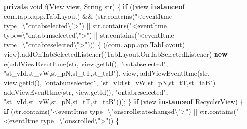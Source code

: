 \documentclass[
]{article}
\newenvironment{Shaded}{}{}
\newcommand{\BuiltInTok}[1]{\textcolor[rgb]{0.00,0.50,0.00}{#1}}
\newcommand{\ControlFlowTok}[1]{\textcolor[rgb]{0.00,0.44,0.13}{\textbf{#1}}}
\newcommand{\DataTypeTok}[1]{\textcolor[rgb]{0.56,0.13,0.00}{#1}}
\newcommand{\FunctionTok}[1]{\textcolor[rgb]{0.02,0.16,0.49}{#1}}
\newcommand{\KeywordTok}[1]{\textcolor[rgb]{0.00,0.44,0.13}{\textbf{#1}}}
\newcommand{\NormalTok}[1]{#1}
\newcommand{\OperatorTok}[1]{\textcolor[rgb]{0.40,0.40,0.40}{#1}}
\newcommand{\SpecialCharTok}[1]{\textcolor[rgb]{0.25,0.44,0.63}{#1}}
\newcommand{\StringTok}[1]{\textcolor[rgb]{0.25,0.44,0.63}{#1}}
\begin{document}
\begin{Shaded}
\begin{Highlighting}[]
    \KeywordTok{private} \DataTypeTok{void} \FunctionTok{f}\OperatorTok{(}\BuiltInTok{View}\NormalTok{ view}\OperatorTok{,} \BuiltInTok{String}\NormalTok{ str}\OperatorTok{)} \OperatorTok{\{}
        \ControlFlowTok{if} \OperatorTok{((}\NormalTok{view }\KeywordTok{instanceof}\NormalTok{ com}\OperatorTok{.}\FunctionTok{iapp}\OperatorTok{.}\FunctionTok{app}\OperatorTok{.}\FunctionTok{TabLayout}\OperatorTok{)} \OperatorTok{\&\&} \OperatorTok{(}\NormalTok{str}\OperatorTok{.}\FunctionTok{contains}\OperatorTok{(}\StringTok{"\textless{}eventItme type=}\SpecialCharTok{\textbackslash{}"}\StringTok{ontabselected}\SpecialCharTok{\textbackslash{}"}\StringTok{\textgreater{}"}\OperatorTok{)} \OperatorTok{||}\NormalTok{ str}\OperatorTok{.}\FunctionTok{contains}\OperatorTok{(}\StringTok{"\textless{}eventItme type=}\SpecialCharTok{\textbackslash{}"}\StringTok{ontabunselected}\SpecialCharTok{\textbackslash{}"}\StringTok{\textgreater{}"}\OperatorTok{)} \OperatorTok{||}\NormalTok{ str}\OperatorTok{.}\FunctionTok{contains}\OperatorTok{(}\StringTok{"\textless{}eventItme type=}\SpecialCharTok{\textbackslash{}"}\StringTok{ontabreselected}\SpecialCharTok{\textbackslash{}"}\StringTok{\textgreater{}"}\OperatorTok{)))} \OperatorTok{\{}
            \OperatorTok{((}\NormalTok{com}\OperatorTok{.}\FunctionTok{iapp}\OperatorTok{.}\FunctionTok{app}\OperatorTok{.}\FunctionTok{TabLayout}\OperatorTok{)}\NormalTok{ view}\OperatorTok{).}\FunctionTok{addOnTabSelectedListener}\OperatorTok{((}\NormalTok{TabLayout}\OperatorTok{.}\FunctionTok{OnTabSelectedListener}\OperatorTok{)} \KeywordTok{new} \FunctionTok{e}\OperatorTok{(}\FunctionTok{addViewEventItme}\OperatorTok{(}\NormalTok{str}\OperatorTok{,}\NormalTok{ view}\OperatorTok{.}\FunctionTok{getId}\OperatorTok{(),} \StringTok{"ontabselected"}\OperatorTok{,} \StringTok{"st\_vId,st\_vW,st\_pN,st\_tT,st\_taB"}\OperatorTok{),}\NormalTok{ view}\OperatorTok{,} \FunctionTok{addViewEventItme}\OperatorTok{(}\NormalTok{str}\OperatorTok{,}\NormalTok{ view}\OperatorTok{.}\FunctionTok{getId}\OperatorTok{(),} \StringTok{"ontabunselected"}\OperatorTok{,} \StringTok{"st\_vId,st\_vW,st\_pN,st\_tT,st\_taB"}\OperatorTok{),} \FunctionTok{addViewEventItme}\OperatorTok{(}\NormalTok{str}\OperatorTok{,}\NormalTok{ view}\OperatorTok{.}\FunctionTok{getId}\OperatorTok{(),} \StringTok{"ontabreselected"}\OperatorTok{,} \StringTok{"st\_vId,st\_vW,st\_pN,st\_tT,st\_taB"}\OperatorTok{)));}
        \OperatorTok{\}}
        \ControlFlowTok{if} \OperatorTok{(}\NormalTok{view }\KeywordTok{instanceof}\NormalTok{ RecyclerView}\OperatorTok{)} \OperatorTok{\{}
            \ControlFlowTok{if} \OperatorTok{(}\NormalTok{str}\OperatorTok{.}\FunctionTok{contains}\OperatorTok{(}\StringTok{"\textless{}eventItme type=}\SpecialCharTok{\textbackslash{}"}\StringTok{onscrollstatechanged}\SpecialCharTok{\textbackslash{}"}\StringTok{\textgreater{}"}\OperatorTok{)} \OperatorTok{||}\NormalTok{ str}\OperatorTok{.}\FunctionTok{contains}\OperatorTok{(}\StringTok{"\textless{}eventItme type=}\SpecialCharTok{\textbackslash{}"}\StringTok{onscrolled}\SpecialCharTok{\textbackslash{}"}\StringTok{\textgreater{}"}\OperatorTok{))} \OperatorTok{\{}

\end{Highlighting}
\end{Shaded}
\end{document}
